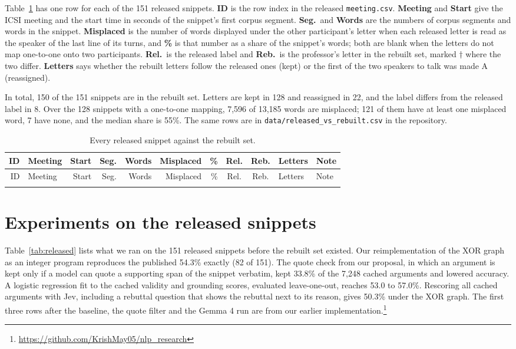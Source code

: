 \documentclass[11pt]{article}
\begin{document}
Table~\ref{tab:appendix} has one row for each of the 151 released snippets.
\textbf{ID} is the row index in the released \texttt{meeting.csv}.
\textbf{Meeting} and \textbf{Start} give the ICSI meeting and the start time in seconds of the snippet's first corpus segment.
\textbf{Seg.}\ and \textbf{Words} are the numbers of corpus segments and words in the snippet.
\textbf{Misplaced} is the number of words displayed under the other participant's letter when each released letter is read as the speaker of the last line of its turns, and \textbf{\%} is that number as a share of the snippet's words; both are blank when the letters do not map one-to-one onto two participants.
\textbf{Rel.}\ is the released label and \textbf{Reb.}\ is the professor's letter in the rebuilt set, marked $\dagger$ where the two differ.
\textbf{Letters} says whether the rebuilt letters follow the released ones (kept) or the first of the two speakers to talk was made A (reassigned).

In total, 150 of the 151 snippets are in the rebuilt set.
Letters are kept in 128 and reassigned in 22, and the label differs from the released label in 8.
Over the 128 snippets with a one-to-one mapping, 7,596 of 13,185 words are misplaced; 121 of them have at least one misplaced word, 7 have none, and the median share is 55\%.
The same rows are in \texttt{data/released\_vs\_rebuilt.csv} in the repository.

{\small
\setlength{\tabcolsep}{4.5pt}
\begin{longtable}{rlrrrrrcclp{3.9cm}}
\caption{Every released snippet against the rebuilt set.}\label{tab:appendix}\\
\toprule
ID & Meeting & Start & Seg. & Words & Misplaced & \% & Rel. & Reb. & Letters & Note \\
\midrule
\endfirsthead
\toprule
ID & Meeting & Start & Seg. & Words & Misplaced & \% & Rel. & Reb. & Letters & Note \\
\midrule
\endhead
\bottomrule
\endfoot

\end{longtable}
}

\section{Experiments on the released snippets}
\label{sec:released}

Table~\ref{tab:released} lists what we ran on the 151 released snippets before the rebuilt set existed.
Our reimplementation of the XOR graph as an integer program reproduces the published 54.3\% exactly (82 of 151).
The quote check from our proposal, in which an argument is kept only if a model can quote a supporting span of the snippet verbatim, kept 33.8\% of the 7,248 cached arguments and lowered accuracy.
A logistic regression fit to the cached validity and grounding scores, evaluated leave-one-out, reaches 53.0 to 57.0\%.
Rescoring all cached arguments with Jev, including a rebuttal question that shows the rebuttal next to its reason, gives 50.3\% under the XOR graph.
The first three rows after the baseline, the quote filter and the Gemma 4 run are from our earlier implementation.\footnote{\url{https://github.com/KrishMay05/nlp_research}}
\end{document}
